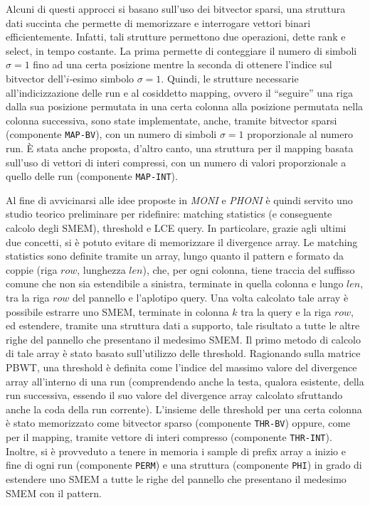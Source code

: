 \documentclass[a4paper,11pt, oneside,italian]{article}
\begin{document}
Alcuni di questi approcci si basano sull'uso dei bitvector 
sparsi, una struttura dati succinta che permette di memorizzare e interrogare
vettori binari efficientemente. Infatti, tali strutture permettono due
operazioni, dette rank e select, in tempo costante. La prima permette di
conteggiare il 
numero di simboli $\sigma=1$ fino ad una certa posizione mentre la seconda di
ottenere l'indice sul bitvector dell'$i$-esimo simbolo $\sigma=1$.
Quindi, le strutture necessarie all'indicizzazione delle run e al cosiddetto
mapping, ovvero il ``seguire'' una riga dalla sua posizione permutata in una
certa colonna alla posizione permutata nella colonna successiva,
sono state implementate, anche, tramite bitvector sparsi (componente
\texttt{MAP-BV}), 
con un numero di simboli 
$\sigma=1$ proporzionale al numero run. È stata anche proposta, d'altro canto,
una struttura per il mapping basata sull'uso di vettori di interi compressi,
con un numero di valori proporzionale a quello delle run (componente
\texttt{MAP-INT}). 

Al fine di avvicinarsi alle idee proposte in \textit{MONI} e \textit{PHONI} è
quindi servito uno studio teorico preliminare per ridefinire: matching
statistics (e conseguente calcolo degli SMEM), threshold e LCE query. In
particolare, grazie agli  
ultimi due concetti, si è potuto evitare di memorizzare il divergence array.
Le matching statistics sono definite tramite un array,
lungo quanto il pattern e formato da coppie (riga $row$, lunghezza $len$), che,
per ogni colonna, tiene traccia del suffisso comune che non sia estendibile a
sinistra, terminate in quella colonna e lungo $len$, tra la riga $row$ del
pannello e l'aplotipo query. Una volta calcolato tale
array è possibile estrarre uno SMEM, terminate in colonna $k$ tra la query e la
riga $row$, ed estendere, tramite una struttura dati a supporto, tale risultato
a tutte le altre righe del pannello che presentano il medesimo SMEM.
Il primo metodo di calcolo di tale array è stato basato sull'utilizzo delle
threshold. Ragionando sulla matrice PBWT, una threshold è definita
come l'indice del massimo valore del divergence array all'interno di una run
(comprendendo anche la testa, qualora esistente, della run successiva, essendo
il suo valore del divergence array calcolato sfruttando anche la coda della run
corrente). L'insieme delle threshold per una certa colonna è stato memorizzato
come bitvector sparso (componente \texttt{THR-BV}) oppure, come per il mapping,
tramite vettore di interi compresso (componente \texttt{THR-INT}). Inoltre, si è
provveduto a tenere in memoria i  
sample di prefix array a inizio e fine di ogni run (componente \texttt{PERM}) e
una struttura (componente \texttt{PHI}) in grado di estendere uno SMEM a tutte
le righe del pannello che presentano il medesimo SMEM con il pattern. 
\end{document}
